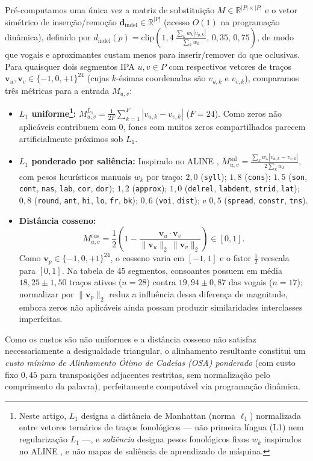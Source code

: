 \documentclass[a4paper, twocolumn, 11pt, twoside]{article}
\begin{document}
Pré-computamos uma única vez a matriz de substituição $M \in \mathbb{R}^{|P|\times|P|}$ e o vetor simétrico de inserção/remoção $\mathbf{d}_{\text{indel}} \in \mathbb{R}^{|P|}$ (acesso $O(1)$ na programação dinâmica), definido por $d_{\text{indel}}(p) = \mathrm{clip}\!\left(1{,}4\,\frac{\sum_k w_k |v_{p,k}|}{\sum_k w_k},\, 0{,}35,\, 0{,}75\right)$, de modo que vogais e aproximantes custam menos para inserir/remover do que oclusivas. Para quaisquer dois segmentos IPA $u, v \in P$ com respectivos vetores de traços $\mathbf{v}_u, \mathbf{v}_v \in \{-1, 0, +1\}^{24}$ (cujas $k$-ésimas coordenadas são $v_{u,k}$ e $v_{v,k}$), comparamos três métricas para a entrada $M_{u,v}$:
\begin{itemize}
    \item \textbf{$L_1$ uniforme\footnote{Neste artigo, $L_1$ designa a distância de Manhattan (norma $\ell_1$) normalizada entre vetores ternários de traços fonológicos --- não primeira língua (L1) nem regularização $L_1$ ---, e \emph{saliência} designa pesos fonológicos fixos $w_k$ inspirados no ALINE \citep{kondrak2003phonetic}, e não mapas de saliência de aprendizado de máquina.}:} $M_{u,v}^{L_1} = \frac{1}{2F}\sum_{k=1}^F |v_{u,k} - v_{v,k}|$ ($F=24$). Como zeros não aplicáveis contribuem com $0$, fones com muitos zeros compartilhados parecem artificialmente próximos sob $L_1$.
    \item \textbf{$L_1$ ponderado por saliência:} Inspirado no ALINE \citep{kondrak2003phonetic}, $M_{u,v}^{\text{sal}} = \frac{\sum_k w_k |v_{u,k} - v_{v,k}|}{2\sum_k w_k}$, com pesos heurísticos manuais $w_k$ por traço: $2{,}0$ (\texttt{syll}); $1{,}8$ (\texttt{cons}); $1{,}5$ (\texttt{son}, \texttt{cont}, \texttt{nas}, \texttt{lab}, \texttt{cor}, \texttt{dor}); $1{,}2$ (\texttt{approx}); $1{,}0$ (\texttt{delrel}, \texttt{labdent}, \texttt{strid}, \texttt{lat}); $0{,}8$ (\texttt{round}, \texttt{ant}, \texttt{hi}, \texttt{lo}, \texttt{fr}, \texttt{bk}); $0{,}6$ (\texttt{voi}, \texttt{dist}); e $0{,}5$ (\texttt{spread}, \texttt{constr}, \texttt{tns}).
    \item \textbf{Distância cosseno:}
    \begin{equation}
        M_{u,v}^{\cos} = \frac{1}{2}\left(1 - \frac{\mathbf{v}_u \cdot \mathbf{v}_v}{\lVert \mathbf{v}_u \rVert_2 \, \lVert \mathbf{v}_v \rVert_2}\right) \in [0, 1].
    \end{equation}
    Como $\mathbf{v}_p \in \{-1,0,+1\}^{24}$, o cosseno varia em $[-1,1]$ e o fator $\frac{1}{2}$ reescala para $[0,1]$. Na tabela de 45 segmentos, consoantes possuem em média $18{,}25 \pm 1{,}50$ traços ativos ($n=28$) contra $19{,}94 \pm 0{,}87$ das vogais ($n=17$); normalizar por $\lVert \mathbf{v}_p \rVert_2$ reduz a influência dessa diferença de magnitude, embora zeros não aplicáveis ainda possam produzir similaridades interclasses imperfeitas.
\end{itemize}
Como os custos são não uniformes e a distância cosseno não satisfaz necessariamente a desigualdade triangular, o alinhamento resultante constitui um \emph{custo mínimo de Alinhamento Ótimo de Cadeias (OSA) ponderado} (com custo fixo $0{,}45$ para transposições adjacentes restritas, sem normalização pelo comprimento da palavra), perfeitamente computável via programação dinâmica.
\end{document}
